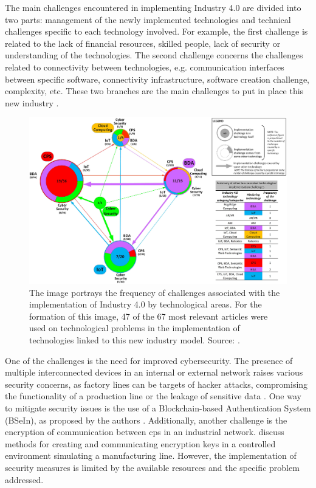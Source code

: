 The main challenges encountered in implementing Industry 4.0 are divided into two parts: management of the newly implemented technologies and technical challenges specific to each technology involved. For example, the first challenge is related to the lack of financial resources, skilled people, lack of security or understanding of the technologies. The second challenge concerns the challenges related to connectivity between technologies, e.g. communication interfaces between specific software, connectivity infrastructure, software creation challenge, complexity, etc. These two branches are the main challenges to put in place this new industry \cite{Rikalovic2022}.

\begin{figure}[ht!]
    \centering
    \includegraphics[scale=0.95]{images/Related/chalanges.png}
    \caption{The image portrays the frequency of challenges associated with the implementation of Industry 4.0 by technological areas. For the formation of this image, 47 of the 67 most relevant articles were used on technological problems in the implementation of technologies linked to this new industry model. Source: \cite{Rikalovic2022}.}

    \label{fig:chalanges}
\end{figure}

One of the challenges is the need for improved cybersecurity. The presence of multiple interconnected devices in an internal or external network raises various security concerns, as factory lines can be targets of hacker attacks, compromising the functionality of a production line or the leakage of sensitive data \cite{Gilchrist2016}. One way to mitigate security issues is the use of a Blockchain-based Authentication System (BSeIn), as proposed by the authors \textcite{LIN201842}. Additionally, another challenge is the encryption of communication between \acrfull{cps} in an industrial network. \textcite{Kreiser2018} discuss methods for creating and communicating encryption keys in a controlled environment simulating a manufacturing line. However, the implementation of security measures is limited by the available resources and the specific problem addressed.

